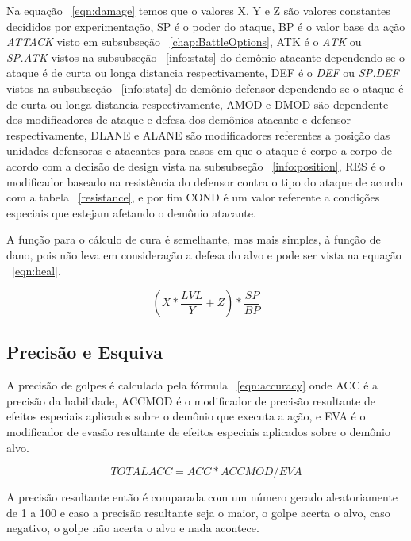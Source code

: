 \documentclass[
	12pt,				%
	openright,			%
	twoside,			%
	a4paper,			%
	english,			%
	french,				%
	spanish,			%
	brazil				%
	]{abntex2}
\begin{document}
	Na equação ~\ref{eqn:damage} temos que o valores X, Y e Z são valores constantes decididos por experimentação, SP é o poder do ataque, BP é o valor base da ação \emph{ATTACK} visto em subsubseção ~\ref{chap:BattleOptions}, ATK é o \emph{ATK} ou \emph{SP.ATK} vistos na subsubseção ~\ref{info:stats} do demônio atacante dependendo se o ataque é de curta ou longa distancia respectivamente, DEF é o \emph{DEF} ou \emph{SP.DEF} vistos na subsubseção ~\ref{info:stats} do demônio defensor dependendo se o ataque é de curta ou longa distancia respectivamente, AMOD e DMOD são dependente dos modificadores de ataque e defesa dos demônios atacante e defensor respectivamente, DLANE e ALANE são modificadores referentes a posição das unidades defensoras e atacantes para casos em que o ataque é corpo a corpo de acordo com a decisão de design vista na subsubseção ~\ref{info:position}, RES é o modificador baseado na resistência do defensor contra o tipo do ataque de acordo com a tabela ~\ref{resistance}, e por fim COND é um valor referente a condições especiais que estejam afetando o demônio atacante.
	
	A função para o cálculo de cura é semelhante, mas mais simples, à função de dano, pois não leva em consideração a defesa do alvo e pode ser vista na equação ~\ref{eqn:heal}.

\begin{equation}
\label{eqn:heal}
(X*\frac{LVL}{Y} + Z) * \frac{SP}{BP} 
\end{equation}


\subsection{Precisão e Esquiva}

A precisão de golpes é calculada pela fórmula ~\ref{eqn:accuracy} onde ACC é a precisão da habilidade, ACCMOD é o modificador de precisão resultante de efeitos especiais aplicados sobre o demônio que executa a ação, e EVA é o modificador de evasão resultante de efeitos especiais aplicados sobre o demônio alvo.

\begin{equation}
\label{eqn:accuracy}
TOTALACC = ACC * ACCMOD / EVA
\end{equation}

	A precisão resultante então é comparada com um número gerado aleatoriamente de 1 a 100 e caso a precisão resultante seja o maior, o golpe acerta o alvo, caso negativo, o golpe não acerta o alvo e nada acontece.
\end{document}
